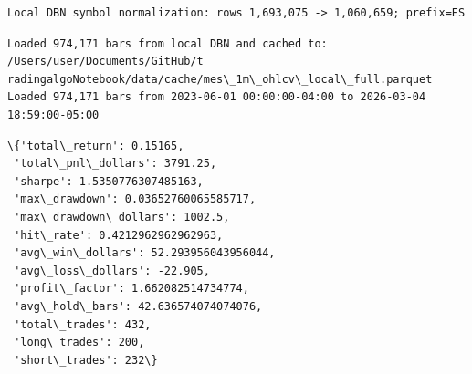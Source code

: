 \documentclass[11pt]{article}
\makeatletter
\newcommand{\boxspacing}{\kern\kvtcb@left@rule\kern\kvtcb@boxsep}
\newcommand{\prompt}[4]{
        {\ttfamily\llap{{\color{#2}[#3]:\hspace{3pt}#4}}\vspace{-\baselineskip}}
    }
\makeatother
\begin{document}
    \begin{Verbatim}[commandchars=\\\{\}]
Local DBN symbol normalization: rows 1,693,075 -> 1,060,659; prefix=ES
    \end{Verbatim}

    \begin{Verbatim}[commandchars=\\\{\}]
Loaded 974,171 bars from local DBN and cached to: /Users/user/Documents/GitHub/t
radingalgoNotebook/data/cache/mes\_1m\_ohlcv\_local\_full.parquet
Loaded 974,171 bars from 2023-06-01 00:00:00-04:00 to 2026-03-04 18:59:00-05:00
    \end{Verbatim}

            \begin{tcolorbox}[breakable, size=fbox, boxrule=.5pt, pad at break*=1mm, opacityfill=0]
\prompt{Out}{outcolor}{8}{\boxspacing}
\begin{Verbatim}[commandchars=\\\{\}]
\{'total\_return': 0.15165,
 'total\_pnl\_dollars': 3791.25,
 'sharpe': 1.5350776307485163,
 'max\_drawdown': 0.03652760065585717,
 'max\_drawdown\_dollars': 1002.5,
 'hit\_rate': 0.4212962962962963,
 'avg\_win\_dollars': 52.293956043956044,
 'avg\_loss\_dollars': -22.905,
 'profit\_factor': 1.662082514734774,
 'avg\_hold\_bars': 42.636574074074076,
 'total\_trades': 432,
 'long\_trades': 200,
 'short\_trades': 232\}
\end{Verbatim}
\end{tcolorbox}
        
\end{document}
